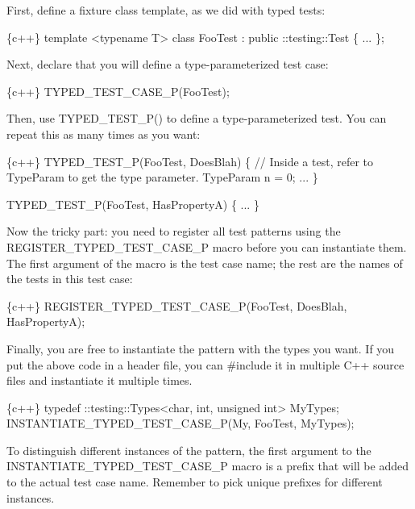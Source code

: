First, define a fixture class template, as we did with typed tests\+:


\begin{DoxyCode}
\{c++\}
template <typename T>
class FooTest : public ::testing::Test \{
  ...
\};
\end{DoxyCode}


Next, declare that you will define a type-\/parameterized test case\+:


\begin{DoxyCode}
\{c++\}
TYPED\_TEST\_CASE\_P(FooTest);
\end{DoxyCode}


Then, use {\ttfamily T\+Y\+P\+E\+D\+\_\+\+T\+E\+S\+T\+\_\+\+P()} to define a type-\/parameterized test. You can repeat this as many times as you want\+:


\begin{DoxyCode}
\{c++\}
TYPED\_TEST\_P(FooTest, DoesBlah) \{
  // Inside a test, refer to TypeParam to get the type parameter.
  TypeParam n = 0;
  ...
\}

TYPED\_TEST\_P(FooTest, HasPropertyA) \{ ... \}
\end{DoxyCode}


Now the tricky part\+: you need to register all test patterns using the {\ttfamily R\+E\+G\+I\+S\+T\+E\+R\+\_\+\+T\+Y\+P\+E\+D\+\_\+\+T\+E\+S\+T\+\_\+\+C\+A\+S\+E\+\_\+P} macro before you can instantiate them. The first argument of the macro is the test case name; the rest are the names of the tests in this test case\+:


\begin{DoxyCode}
\{c++\}
REGISTER\_TYPED\_TEST\_CASE\_P(FooTest,
                           DoesBlah, HasPropertyA);
\end{DoxyCode}


Finally, you are free to instantiate the pattern with the types you want. If you put the above code in a header file, you can {\ttfamily \#include} it in multiple C++ source files and instantiate it multiple times.


\begin{DoxyCode}
\{c++\}
typedef ::testing::Types<char, int, unsigned int> MyTypes;
INSTANTIATE\_TYPED\_TEST\_CASE\_P(My, FooTest, MyTypes);
\end{DoxyCode}


To distinguish different instances of the pattern, the first argument to the {\ttfamily I\+N\+S\+T\+A\+N\+T\+I\+A\+T\+E\+\_\+\+T\+Y\+P\+E\+D\+\_\+\+T\+E\+S\+T\+\_\+\+C\+A\+S\+E\+\_\+P} macro is a prefix that will be added to the actual test case name. Remember to pick unique prefixes for different instances.

